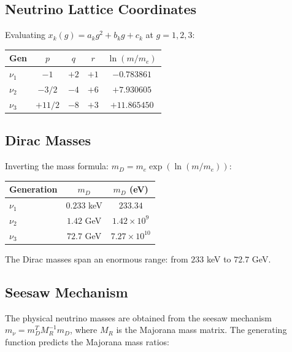 \subsection{Neutrino Lattice Coordinates}\label{app:nu_coords}

Evaluating $x_k(g) = a_k g^2 + b_k g + c_k$ at $g = 1, 2, 3$:

\begin{center}
\label{tab:nu_coords}
\begin{tabular}{lcccc}
\hline\hline
Gen & $p$ & $q$ & $r$ & $\ln(m/m_e)$ \\
\hline
$\nu_1$ & $-1$ & $+2$ & $+1$ & $-0.783861$ \\
$\nu_2$ & $-3/2$ & $-4$ & $+6$ & $+7.930605$ \\
$\nu_3$ & $+11/2$ & $-8$ & $+3$ & $+11.865450$ \\
\hline\hline
\end{tabular}
\end{center}

\subsection{Dirac Masses}\label{app:nu_dirac}

Inverting the mass formula: $m_D = m_e \exp(\ln(m/m_e))$:

\begin{center}
\label{tab:nu_dirac}
\begin{tabular}{lcc}
\hline\hline
Generation & $m_D$ & $m_D$ (eV) \\
\hline
$\nu_1$ & $0.233$ keV & $233.34$ \\
$\nu_2$ & $1.42$ GeV & $1.42 \times 10^9$ \\
$\nu_3$ & $72.7$ GeV & $7.27 \times 10^{10}$ \\
\hline\hline
\end{tabular}
\end{center}

The Dirac masses span an enormous range: from $233$ keV to $72.7$ GeV.

\subsection{Seesaw Mechanism}\label{app:nu_seesaw}

The physical neutrino masses are obtained from the seesaw mechanism~\cite{maki1962,pontecorvo1967} $m_\nu = m_D^T M_R^{-1} m_D$, where $M_R$ is the Majorana mass matrix. The generating function predicts the Majorana mass ratios:


